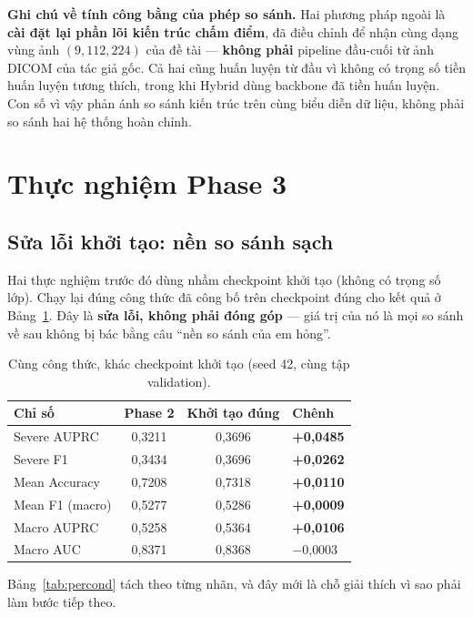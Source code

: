 \documentclass[11pt,a4paper]{article}
\newcommand{\up}[1]{\textcolor{teal!70!black}{\textbf{#1}}}
\begin{document}
\textbf{Ghi chú về tính công bằng của phép so sánh.} Hai phương pháp ngoài là \textbf{cài đặt lại
phần lõi kiến trúc chấm điểm}, đã điều chỉnh để nhận cùng dạng vùng ảnh $(9,112,224)$ của đề tài
--- \textbf{không phải} pipeline đầu-cuối từ ảnh DICOM của tác giả gốc. Cả hai cũng huấn luyện từ
đầu vì không có trọng số tiền huấn luyện tương thích, trong khi Hybrid dùng backbone đã tiền
huấn luyện. Con số vì vậy phản ánh so sánh kiến trúc trên cùng biểu diễn dữ liệu, không phải so
sánh hai hệ thống hoàn chỉnh.

\section{Thực nghiệm Phase 3}

\subsection{Sửa lỗi khởi tạo: nền so sánh sạch}

Hai thực nghiệm trước đó dùng nhầm checkpoint khởi tạo (không có trọng số lớp). Chạy lại
đúng công thức đã công bố trên checkpoint đúng cho kết quả ở Bảng~\ref{tab:runc}.
Đây là \textbf{sửa lỗi, không phải đóng góp} --- giá trị của nó là mọi so sánh về sau không bị
bác bằng câu ``nền so sánh của em hỏng''.

\begin{table}[htbp]
\centering\small
\caption{Cùng công thức, khác checkpoint khởi tạo (seed 42, cùng tập validation).}
\label{tab:runc}
\begin{tabular}{lccl}
\toprule
\textbf{Chỉ số} & \textbf{Phase 2} & \textbf{Khởi tạo đúng} & \textbf{Chênh} \\
\midrule
Severe AUPRC    & 0{,}3211 & 0{,}3696 & \up{+0{,}0485} \\
Severe F1       & 0{,}3434 & 0{,}3696 & \up{+0{,}0262} \\
Mean Accuracy   & 0{,}7208 & 0{,}7318 & \up{+0{,}0110} \\
Mean F1 (macro) & 0{,}5277 & 0{,}5286 & \up{+0{,}0009} \\
Macro AUPRC     & 0{,}5258 & 0{,}5364 & \up{+0{,}0106} \\
Macro AUC       & 0{,}8371 & 0{,}8368 & $-$0{,}0003 \\
\bottomrule
\end{tabular}
\end{table}

Bảng~\ref{tab:percond} tách theo từng nhãn, và đây mới là chỗ giải thích vì sao phải làm
bước tiếp theo.
\end{document}
